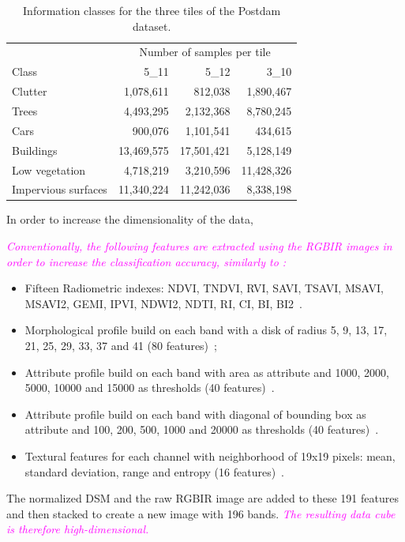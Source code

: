 \documentclass[journal,10pt]{IEEEtran}
\newcommand{\rev}[1]{\textcolor{magenta}{\emph{#1}}}
\begin{document}
    \begin{table}[!t]
        \centering
        \caption{Information classes for the three tiles of the Postdam dataset.\label{tab:potsdam}}
        \begin{tabular}[b]{lrrr}\toprule
          & \multicolumn{3}{c}{Number of samples per tile}\\
            \cmidrule{2-4}
            Class &   5\_11  &   5\_12  & 3\_10 \\
          \midrule
          Clutter             & 1,078,611  & 812,038    & 1,890,467 \\
          Trees               & 4,493,295  & 2,132,368  & 8,780,245 \\
          Cars                & 900,076    & 1,101,541  & 434,615 \\
          Buildings           & 13,469,575 & 17,501,421 & 5,128,149 \\
          Low vegetation      & 4,718,219  & 3,210,596  & 11,428,326 \\
          Impervious surfaces & 11,340,224 & 11,242,036 & 8,338,198 \\
          \bottomrule
        \end{tabular}
    \end{table}

    In order to increase the dimensionality of the data,

    \rev{Conventionally,  the following  features are  extracted using  the
    RGBIR  images in  order to  increase the  classification accuracy,
    similarly to \cite{tuia2015multiclass}:}
    \begin{itemize}
        \item Fifteen Radiometric indexes: NDVI, TNDVI, RVI, SAVI, TSAVI, MSAVI, MSAVI2, GEMI, IPVI, NDWI2, NDTI, RI, CI, BI, BI2~\cite{otb}.
        \item Morphological profile build on each band with a disk of radius 5, 9, 13, 17, 21, 25, 29, 33, 37 and 41 (80 features)~\cite{fauvel2013advances};
        \item Attribute profile build on each band with area as attribute and 1000, 2000, 5000, 10000 and 15000 as thresholds (40 features)~\cite{dalla2010morphological}.
        \item Attribute profile build on each band with diagonal of bounding box as attribute and 100, 200, 500, 1000 and 20000 as thresholds (40 features)~\cite{dalla2010morphological}.
        \item Textural features for  each channel with neighborhood of
          19x19 pixels:  mean, standard  deviation, range  and entropy
          (16 features)~\cite{otb}.
    \end{itemize}
    The normalized DSM and the raw  RGBIR image are added to these 191
    features and  then stacked to create  a new image with  196 bands.
    \rev{The  resulting  data cube  is  therefore  high-dimensional.} 
    
\end{document}

